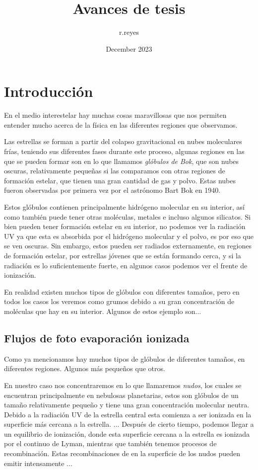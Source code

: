 \documentclass{book}
\title{Avances de tesis}
\author{r.reyes }
\date{December 2023}
\begin{document}
\maketitle

\tableofcontents

\newpage

\chapter{Introducción}

En el medio interestelar hay muchas cosas maravillosas que nos permiten entender mucho acerca de la física en las diferentes regiones que observamos.

Las estrellas se forman a partir del colapso gravitacional en nubes moleculares frías, teniendo sus diferentes fases durante este proceso, algunas regiones en las que se pueden formar son en lo que llamamos \textit{glóbulos de Bok}, que son nubes oscuras, relativamente pequeñas si las comparamos con otras regiones de formación estelar, que tienen una gran cantidad de gas y polvo. Estas nubes fueron observadas por primera vez por el astrónomo Bart Bok en 1940. 

Estos glóbulos contienen principalmente hidrógeno molecular en su interior, así como también puede tener otras moléculas, metales e incluso algunos silicatos. Si bien pueden tener formación estelar en su interior, no podemos ver la radiación UV ya que esta es absorbida por el hidrógeno molecular y el polvo, es por eso que se ven oscuras. Sin embargo, estos pueden ser radiados externamente, en regiones de formación estelar, por estrellas jóvenes que se están formando cerca, y si la radiación es lo suficientemente fuerte, en algunos casos podemos ver el frente de ionización.

En realidad existen muchos tipos de glóbulos con diferentes tamaños, pero en todos los casos los veremos como grumos debido a su gran concentración de moléculas que hay en su interior. Algunos de estos ejemplo son...

\section{Flujos de foto evaporación ionizada}

Como ya mencionamos hay muchos tipos de glóbulos de diferentes tamaños, en diferentes regiones. Algunos más pequeños que otros. 

En nuestro caso nos concentraremos en lo que llamaremos \textit{nudos}, los cuales se encuentran principalmente en nebulosas planetarias, estos son glóbulos de un tamaño relativamente pequeño y tiene una gran concentración molecular neutra. Debido a la radiación UV de la estrella central esta comienza a ser ionizada en la superficie más cercana a la estrella. ...
Después de cierto tiempo, podemos llegar a un equilibrio de ionización, donde esta superficie cercana a la estrella es ionizada por el continuo de Lyman, mientras que también tenemos procesos de recombinación. Estas recombinaciones de en la superficie de los nudos pueden emitir intensamente ...
\end{document}

